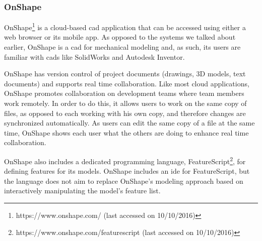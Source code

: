 \subsubsection{OnShape}
OnShape\footnote{https://www.onshape.com/ (last accessed on 10/10/2016)} is a cloud-based \gls{cad} application that can be accessed using either a web browser or its mobile app.
As opposed to the systems we talked about earlier, OnShape is a \gls{cad} for mechanical modeling and, as such, its users are familiar with \glspl{cad} like SolidWorks and Autodesk Inventor.

OnShape has version control of project documents (drawings, 3D models, text documents) and supports real time collaboration.
Like most cloud applications, OnShape promotes collaboration on development teams where team members work remotely.
In order to do this, it allows users to work on the same copy of files, as opposed to each working with his own copy, and therefore changes are synchronized automatically.
As users can edit the same copy of a file at the same time, OnShape shows each user what the others are doing to enhance real time collaboration.

OnShape also includes a dedicated programming language, FeatureScript\footnote{https://www.onshape.com/featurescript (last accessed on 10/10/2016)}, for defining features for its models.
OnShape includes an \gls{ide} for FeatureScript, but the language does not aim to replace OnShape's modeling approach based on interactively manipulating the model's feature list.


